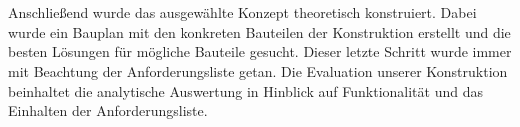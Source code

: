 \documentclass[longdoc,accentcolor=tud1b,11pt,paper=a4]{tudreport}
\newcounter{dummy} %
\begin{document}
	\\
	\\
Anschlie{\ss}end wurde das ausgew\"{a}hlte Konzept theoretisch konstruiert. Dabei wurde ein Bauplan mit den konkreten Bauteilen der Konstruktion erstellt und die besten L\"{o}sungen f\"{u}r m\"{o}gliche Bauteile gesucht. Dieser letzte Schritt wurde immer mit Beachtung der Anforderungsliste getan. Die Evaluation unserer Konstruktion beinhaltet die analytische Auswertung in Hinblick auf Funktionalit\"{a}t und das Einhalten der Anforderungsliste.  
	\tableofcontents
	\cleardoublepage
    


	
\end{document}

